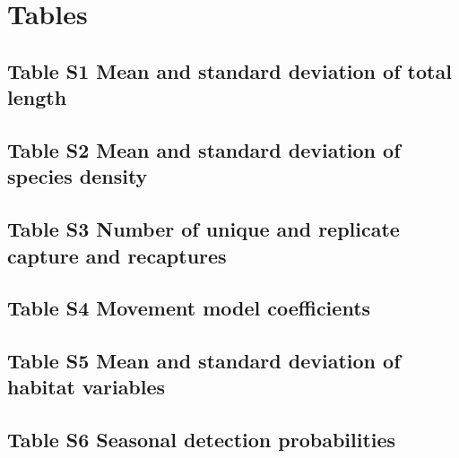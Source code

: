 \documentclass[11pt, class=article, crop=false]{standalone}
\begin{document}
\newpage

\section{Tables}

\subsection{Table S1 Mean and standard deviation of total length}



\newpage
\subsection{Table S2 Mean and standard deviation of species density}



\newpage
\subsection{Table S3 Number of unique and replicate capture and recaptures}



\newpage
\subsection{Table S4 Movement model coefficients}

\small
{}

\newpage
\subsection{Table S5 Mean and standard deviation of habitat variables}



\newpage
\subsection{Table S6 Seasonal detection probabilities}



\newpage


\end{document}
